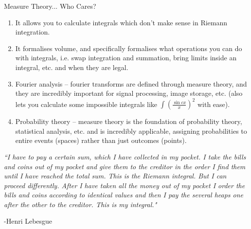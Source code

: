 \documentclass[9pt]{beamer}
\begin{document}
    \begin{frame}{Measure Theory... Who Cares?}

        \pause

        \begin{enumerate}
            \item It allows you to calculate integrals which don't make sense in Riemann integration.\pause
            \item It formalises volume, and specifically formalises what operations you can do with integrals, i.e. swap integration and summation, bring limits inside an integral, etc. and when they are legal.\pause
            \item Fourier analysis -- fourier transforms are defined through measure theory, and they are incredibly important for signal processing, image storage, etc. (also lets you calculate some impossible integrals like $\int\left(\frac{\sin cx}{x}\right)^2$ with ease).\pause
            \item Probability theory -- measure theory is the foundation of probability theory, statistical analysis, etc. and is incredibly applicable, assigning probabilities to entire events (spaces) rather than just outcomes (points).\pause
        \end{enumerate}

        \vspace{12pt}

        \textit{``I have to pay a certain sum, which I have collected in my pocket.
        I take the bills and coins out of my pocket and give them to the creditor in the order I find them until I have reached the total sum.
        This is the Riemann integral.
        But I can proceed differently.
        After I have taken all the money out of my pocket I order the bills and coins according to identical values and then I pay the several heaps one after the other to the creditor.
        This is my integral."}

        \hspace*{\fill} -Henri Lebesgue
        
    \end{frame}
\end{document}
